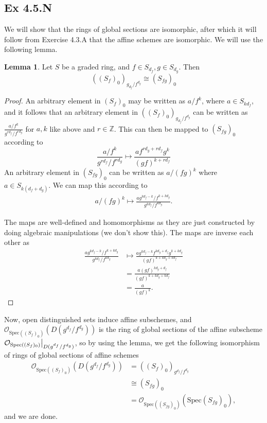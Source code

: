 \documentclass{article}
\newcommand\restr[2]{{%
  \left.\kern-\nulldelimiterspace %
  #1 %
  \vphantom{\big|} %
  \right|_{#2} %
  }}
\theoremstyle{definition}
\newtheorem{lemma}[theorem]{Lemma}
\newcommand{\Z}{\mathbb{Z}}
\newcommand{\oo}{\mathcal{O}}
\newcommand{\osp}[1]{\oo_{\Spec\left(#1\right)}}
\newcommand{\Spec}{\text{Spec}}
\begin{document}
\subsection*{Ex 4.5.N}

We will show that the rings of global sections are isomorphic, after which it
will follow from Exercise 4.3.A that the affine schemes are isomorphic. We
will use the following lemma.

\begin{lemma}
	Let $S$ be a graded ring, and $f \in S_{d_f}, g \in S_{d_g}$. Then
	\[
		((S_{f})_0)_{g_{d_f}/f^{d_g}}
		\cong
		(S_{fg})_0
	\]
\end{lemma}
\begin{proof}
	An arbitrary element in $(S_f)_0$ may be written as $a/f^{k}$, where $a \in
		S_{k d_f}$, and it follows that an arbitrary element in
	$((S_{f})_0)_{g_{d_f}/f^{d_g}}$ can be written as $\frac{a/f^k}{g^{r d_f} /
			f^{r d_g}}$ for $a, k$ like above and $r \in \Z$. This can then be mapped
	to $(S_{fg})_0$ according to
	\[
		\frac{a/f^k}{g^{r d_f} / f^{r d_g}}
		\mapsto
		\frac{a f^{r d_g + r d_f} g^k}{(gf)^{k + r d_f}}
	\]
	An arbitrary element in $(S_{fg})_0$ can be written as
	$a/(fg)^{k}$ where $a \in S_{k (d_f + d_g)}$. We can map
	this according to
	\begin{align*}
		a/(fg)^{k}
		\mapsto
		\frac{a g^{kd_f - k}/f^{k + k d_g}}{g^{k d_f} / f^{k d_g}}.
	\end{align*}

	The maps are well-defined and homomorphisms as they are just constructed by
	doing algebraic manipulations (we don't show this). The maps are inverse
	each other as
	\begin{align*}
		\frac{a g^{kd_f - k}/f^{k + k d_g}}{g^{k d_f} / f^{k d_g}}
		 & \mapsto
		\frac{
			a g^{kd_f - k} f^{k d_g + d_f} g^{k + kd_g}
		}{
			(gf)^{k + kd_g + kd_f}
		}          \\
		 & =
		\frac{
			a (gf)^{k d_g + d_f}
		}{
			(gf)^{k + kd_g + kd_f}
		}          \\
		 & =
		\frac{
			a
		}{
			(gf)^{k}
		}.
	\end{align*}

\end{proof}


Now, open distinguished sets induce affine subschemes, and
$\osp{(S_f)_0}(D(g^{d_f}/f^{d_g}))$ is the ring of global sections of
the affine subscheme $\restr{\osp{(S_f)_0}}{D(g^{d_f}/f^{d_g})}$, so by
using the lemma, we get the following isomorphism of rings of global sections
of affine schemes
\begin{align*}
	\osp{(S_f)_0}(D(g^{d_f}/f^{d_g}))
	 & =
	((S_f)_0)_{g^{d_f}/f^{d_g}} \\
	 & \cong
	(S_{fg})_0                  \\
	 & =
	\osp{(S_{fg})_0}(\Spec(S_{fg})_0),
\end{align*}
and we are done.
\end{document}
